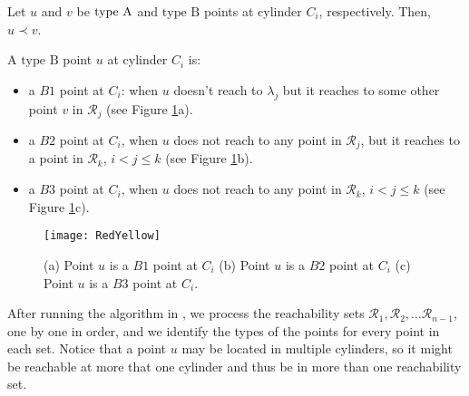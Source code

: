 \documentclass[a4paper,UKenglish]{lipics}
\newcommand{\CR}{{\mathscr R}}
\newcommand{\R}{\CR}
\newcommand{\lei}{\prec}
\newcommand{\SemiBad}{\mbox{type B}}
\newcommand{\lme}[1]{{\lambda_{#1}}}
\begin{document}
\begin{obs} \label{obs:orderABC}
Let $u$ and $v$ be $\mbox{type A}$ and $\SemiBad$  points at cylinder $C_i$, 
respectively. Then, $u \lei v$.
\end{obs}

\begin{obs}
A $\SemiBad$ point $u$ at cylinder $C_i$ is:
\begin{itemize}
\item a $B1$ point at  $C_i$: when $u$ 
doesn't reach to $\lme{j}$ but it reaches to 
some other point $v$ in $\R_j$ 
(see Figure \ref{fig:types}a). 

\item a $B2$ point at $C_i$,
when $u$ does not reach to 
any point in $\R_j$, 
but it reaches to a point in $\R_k$,
$i<j \le k$ (see Figure \ref{fig:types}b).

\item a $B3$ point at $C_i$,
when $u$ does not reach to 
any point in $\R_k$, $i<j \le k$ (see Figure \ref{fig:types}c).

\end{itemize}

\end{obs}

\begin{figure}[t]
	\centering
	\texttt{[image: RedYellow]}
	\caption{(a) Point $u$ is a $B1$ point at $C_i$ 
(b) Point $u$ is a $B2$ point at $C_i$ (c) Point $u$ is a $B3$ point at $C_i$.}
	\label{fig:types}
\end{figure}


After running the algorithm in \cite{cccg11},
we process the reachability sets $\R_1,\R_2, \dots \R_{n-1}$, one by one in order, 
and we identify the types of the points for every point in each set. 
Notice that a point $u$ may be located in 
multiple cylinders, so it might be reachable 
at more that one cylinder and thus
be in more than one reachability set.
\end{document}
